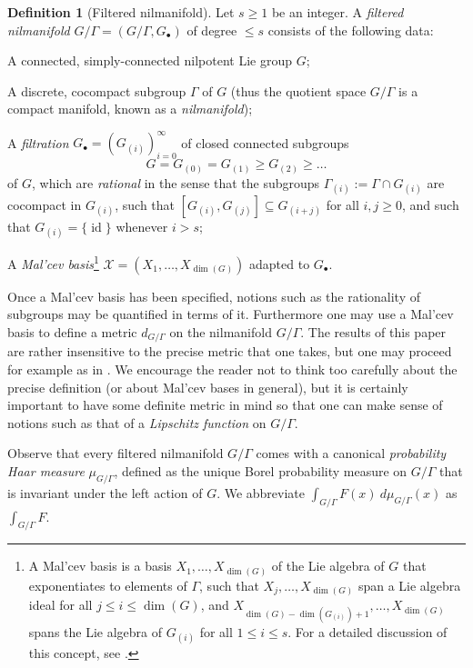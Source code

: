 \documentclass[11pt,reqno]{amsart}
\numberwithin{equation}{section}
\theoremstyle{plain}
\theoremstyle{definition}
\newtheorem{definition}[subsection]{Definition}
\renewcommand{\leq}{\leqslant}
\renewcommand{\geq}{\geqslant}
\newcommand\1{{\bf 1}}
\newcommand\2{{\bf 2}}
\newcommand\id{\operatorname{id}}
\begin{document}
\begin{definition}[Filtered nilmanifold] Let $s \geq 1$ be an integer.  A \emph{filtered nilmanifold} $G/\Gamma = (G/\Gamma, G_\bullet)$ of degree $\leq s$ consists of the following data:

A connected, simply-connected nilpotent Lie group $G$;

A discrete, cocompact subgroup $\Gamma$ of $G$ (thus the quotient space $G/\Gamma$ is a compact manifold, known as a \emph{nilmanifold});

A \emph{filtration} $G_\bullet = (G_{(i)})_{i=0}^\infty$ of closed connected subgroups
$$ G = G_{(0)} = G_{(1)} \geq G_{(2)} \geq \ldots$$
of $G$, which are \emph{rational} in the sense that the subgroups $\Gamma_{(i)} := \Gamma \cap G_{(i)}$ are cocompact in $G_{(i)}$, such that $[G_{(i)},G_{(j)}] \subseteq G_{(i+j)}$ for all $i,j \geq 0$, and such that $G_{(i)}=\{\id\}$ whenever $i>s$;

A \emph{Mal'cev basis}\footnote{A Mal'cev basis is a basis $X_1,\ldots,X_{\dim(G)}$ of the Lie algebra of $G$ that exponentiates to elements of $\Gamma$, such that $X_j,\ldots,X_{\dim(G)}$ span a Lie algebra ideal for all $j \leq i \leq \dim(G)$, and $X_{\dim(G)-\dim(G_{(i)})+1},\ldots,X_{\dim(G)}$ spans the Lie algebra of $G_{(i)}$ for all $1 \leq i \leq s$. For a detailed discussion of this concept, see \cite[\S 2]{green-tao-nilratner}.} $\mathcal{X} = (X_1,\ldots,X_{\dim(G)})$ adapted to $G_{\bullet}$.
\end{definition}

Once a Mal'cev basis has been specified, notions such as the rationality of subgroups may be quantified in terms of it. Furthermore one may use a Mal'cev basis to define a metric $d_{G/\Gamma}$ on the nilmanifold $G/\Gamma$. The results of this paper are rather insensitive to the precise metric that one takes, but one may proceed for example as in \cite[Definition 2.2]{green-tao-nilratner}. We encourage the reader not to think too carefully about the precise definition (or about Mal'cev bases in general), but it is certainly important to have some definite metric in mind so that one can make sense of notions such as that of a \emph{Lipschitz function} on $G/\Gamma$.

Observe that every filtered nilmanifold $G/\Gamma$ comes with a canonical \emph{probability Haar measure} $\mu_{G/\Gamma}$, defined as the unique Borel probability measure on $G/\Gamma$ that is invariant under the left action of $G$.  We abbreviate $\int_{G/\Gamma} F(x)\ d\mu_{G/\Gamma}(x)$ as $\int_{G/\Gamma} F$.
\end{document}
